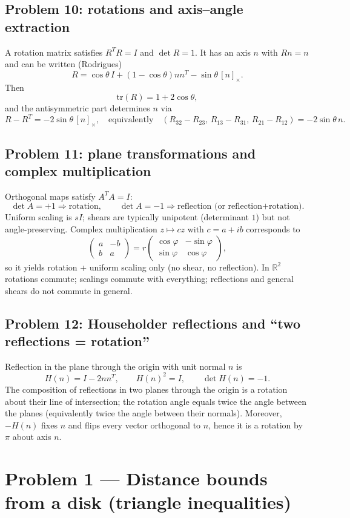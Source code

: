 \documentclass[12pt,a4paper]{article}
\theoremstyle{plain}
\theoremstyle{definition}      %
\begin{document}
\subsection*{Problem 10: rotations and axis--angle extraction}
A rotation matrix satisfies $R^TR=I$ and $\det R=1$.
It has an axis $n$ with $Rn=n$ and can be written (Rodrigues)
\[
R=\cos\theta\,I+(1-\cos\theta)nn^T-\sin\theta\,[n]_\times.
\]
Then
\[
\mathrm{tr}(R)=1+2\cos\theta,
\]
and the antisymmetric part determines $n$ via
\[
R-R^T=-2\sin\theta\,[n]_\times,
\quad\text{equivalently}\quad
(R_{32}-R_{23},\,R_{13}-R_{31},\,R_{21}-R_{12})=-2\sin\theta\,n.
\]

\subsection*{Problem 11: plane transformations and complex multiplication}
Orthogonal maps satisfy $A^TA=I$:
\[
\det A=+1 \Rightarrow \text{rotation},\qquad \det A=-1 \Rightarrow \text{reflection (or reflection+rotation)}.
\]
Uniform scaling is $sI$; shears are typically unipotent (determinant $1$) but not angle-preserving.
Complex multiplication $z\mapsto cz$ with $c=a+ib$ corresponds to
\[
\begin{pmatrix}a&-b\\ b&a\end{pmatrix}
=r\begin{pmatrix}\cos\varphi&-\sin\varphi\\ \sin\varphi&\cos\varphi\end{pmatrix},
\]
so it yields rotation + uniform scaling only (no shear, no reflection).
In $\mathbb R^2$ rotations commute; scalings commute with everything; reflections and general shears do not commute in general.

\subsection*{Problem 12: Householder reflections and ``two reflections = rotation''}
Reflection in the plane through the origin with unit normal $n$ is
\[
H(n)=I-2nn^T,\qquad H(n)^2=I,\qquad \det H(n)=-1.
\]
The composition of reflections in two planes through the origin is a rotation about their line of intersection; the rotation angle equals twice the angle between the planes (equivalently twice the angle between their normals).
Moreover, $-H(n)$ fixes $n$ and flips every vector orthogonal to $n$, hence it is a rotation by $\pi$ about axis $n$.

\section*{Problem 1 — Distance bounds from a disk (triangle inequalities)}
\end{document}
